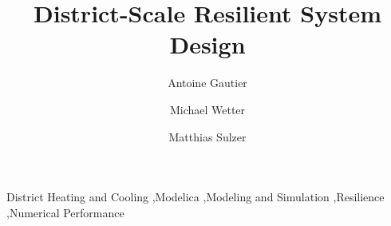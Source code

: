 \begin{frontmatter}



\title{District-Scale Resilient System Design}

%
\author[lbl]{Antoine Gautier}%
\author[lbl]{Michael Wetter}%
\author[empa]{Matthias Sulzer}%
%


\begin{abstract}

\end{abstract}




\begin{keyword}
District Heating and Cooling \sep Modelica \sep Modeling and Simulation \sep Resilience \sep Numerical Performance
\end{keyword}

\end{frontmatter}